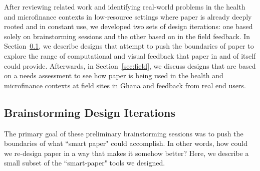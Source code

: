 \documentclass{sig-alternate}
\begin{document}
After reviewing related work and identifying real-world problems in the health and microfinance contexts in low-resource settings where paper is already deeply rooted and in constant use, we developed two sets of design iterations: one based solely on brainstorming sessions and the other based on in the field feedback. In Section~\ref{sec:brainstorming}, we describe designs that attempt to push the boundaries of paper to explore the range of computational and visual feedback that paper in and of itself could provide. Afterwards, in Section~\ref{sec:field}, we discuss designs that are based on a needs assessment to see how paper is being used in the health and microfinance contexts at field sites in Ghana and feedback from real end users.


\subsection{Brainstorming Design Iterations}
\label{sec:brainstorming}

The primary goal of these preliminary brainstorming sessions was to push the boundaries of what ``smart paper" could accomplish. In other words, how could we re-design paper in a way that makes it somehow better? Here, we describe a small subset of the ``smart-paper" tools we designed.
\end{document}
